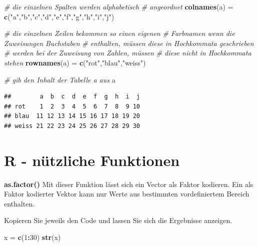 \documentclass[]{book}
\newenvironment{Shaded}{\begin{snugshade}}{\end{snugshade}}
\newcommand{\KeywordTok}[1]{\textcolor[rgb]{0.13,0.29,0.53}{\textbf{#1}}}
\newcommand{\DecValTok}[1]{\textcolor[rgb]{0.00,0.00,0.81}{#1}}
\newcommand{\StringTok}[1]{\textcolor[rgb]{0.31,0.60,0.02}{#1}}
\newcommand{\CommentTok}[1]{\textcolor[rgb]{0.56,0.35,0.01}{\textit{#1}}}
\newcommand{\OperatorTok}[1]{\textcolor[rgb]{0.81,0.36,0.00}{\textbf{#1}}}
\newcommand{\NormalTok}[1]{#1}
\begin{document}
\begin{Shaded}
\begin{Highlighting}[]
\CommentTok{# die einzelnen Spalten werden alphabetisch}
\CommentTok{# angeordnet}
\KeywordTok{colnames}\NormalTok{(a) =}\StringTok{ }\KeywordTok{c}\NormalTok{(}\StringTok{"a"}\NormalTok{,}\StringTok{"b"}\NormalTok{,}\StringTok{"c"}\NormalTok{,}\StringTok{"d"}\NormalTok{,}\StringTok{"e"}\NormalTok{,}\StringTok{"f"}\NormalTok{,}\StringTok{"g"}\NormalTok{,}\StringTok{"h"}\NormalTok{,}\StringTok{"i"}\NormalTok{,}\StringTok{"j"}\NormalTok{)}

\CommentTok{# die einzelnen Zeilen bekommen so einen eigenen}
\CommentTok{# Farbnamen wenn die Zuweisungen Buchstaben }
\CommentTok{# enthalten, müssen diese in Hochkommata geschrieben }
\CommentTok{# werden bei der Zuweisung von Zahlen, müssen }
\CommentTok{# diese nicht in Hochkommata stehen}
\KeywordTok{rownames}\NormalTok{(a) =}\StringTok{ }\KeywordTok{c}\NormalTok{(}\StringTok{"rot"}\NormalTok{,}\StringTok{"blau"}\NormalTok{,}\StringTok{"weiss"}\NormalTok{)}

\CommentTok{# gib den Inhalt der Tabelle a aus}
\NormalTok{a}
\end{Highlighting}
\end{Shaded}

\begin{verbatim}
##        a  b  c  d  e  f  g  h  i  j
## rot    1  2  3  4  5  6  7  8  9 10
## blau  11 12 13 14 15 16 17 18 19 20
## weiss 21 22 23 24 25 26 27 28 29 30
\end{verbatim}

\section{R - nützliche Funktionen}\label{r---nuxfctzliche-funktionen}

\textbf{as.factor()} Mit dieser Funktion lässt sich ein Vector als
Faktor kodieren. Ein als Faktor kodierter Vektor kann nur Werte aus
bestimmten vordefiniertem Bereich enthalten.

Kopieren Sie jeweils den Code und lassen Sie sich die Ergebnisse
anzeigen.

\begin{Shaded}
\begin{Highlighting}[]
\NormalTok{x =}\StringTok{ }\KeywordTok{c}\NormalTok{(}\DecValTok{1}\OperatorTok{:}\DecValTok{30}\NormalTok{)}
\KeywordTok{str}\NormalTok{(x)}
\end{Highlighting}
\end{Shaded}
\end{document}
